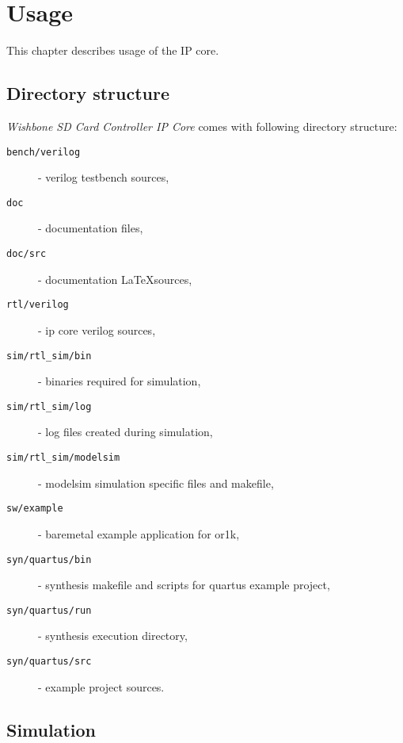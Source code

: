 \section{Usage}
\label{chap:usage}

    This chapter describes usage of the IP core.
    
    \subsection{Directory structure}
    \label{sec:dir_struct}
    
    \textit{Wishbone SD Card Controller IP Core} comes with following directory structure:
    
    
    \begin{description}
    \item[\texttt{bench/verilog}] - verilog testbench sources,
    \item[\texttt{doc}] - documentation files,
    \item[\texttt{doc/src}] - documentation \LaTeX sources,
    \item[\texttt{rtl/verilog}] - ip core verilog sources,
    \item[\texttt{sim/rtl\_sim/bin}] - binaries required for simulation,
    \item[\texttt{sim/rtl\_sim/log}] - log files created during simulation,
    \item[\texttt{sim/rtl\_sim/modelsim}] - modelsim simulation specific files and makefile,
    \item[\texttt{sw/example}] - baremetal example application for or1k,
    \item[\texttt{syn/quartus/bin}] - synthesis makefile and scripts for quartus example project,
    \item[\texttt{syn/quartus/run}] - synthesis execution directory,
    \item[\texttt{syn/quartus/src}] - example project sources.
    \end{description}
    
    \subsection{Simulation}
    \label{sec:simulation}
    
